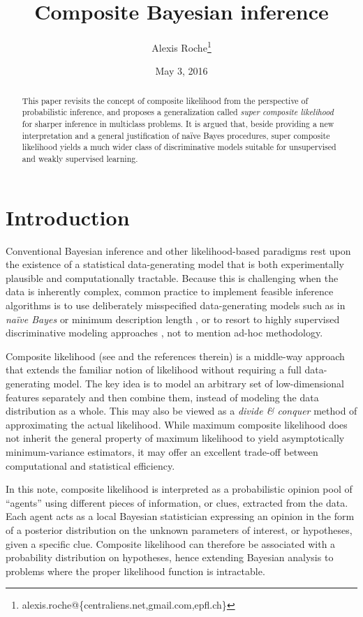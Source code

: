 \documentclass[english]{scrartcl}
\title{Composite Bayesian inference}
\date{May 3, 2016}
\author{Alexis Roche\thanks{alexis.roche@\{centraliens.net,gmail.com,epfl.ch\}}}
\begin{document}
\maketitle

\begin{abstract}
This paper revisits the concept of composite likelihood from the perspective of probabilistic inference, and proposes a generalization called {\em super composite likelihood} for sharper inference in multiclass problems. It is argued that, beside providing a new interpretation and a general justification of na\"ive Bayes procedures, super composite likelihood yields a much wider class of discriminative models suitable for unsupervised and weakly supervised learning.
\end{abstract}


\section{Introduction}
\label{sec:intro}

Conventional Bayesian inference and other likelihood-based paradigms rest upon the existence of a statistical data-generating model that is both experimentally plausible and computationally tractable. Because this is challenging when the data is inherently complex, common practice to implement feasible inference algorithms is to use deliberately misspecified data-generating models \cite{White-82,Walker-13} such as in {\em na\"ive Bayes} \cite{Ng-01} or minimum description length \cite{Grunwald-07}, or to resort to highly supervised discriminative modeling approaches \cite{Ng-01}, not to mention ad-hoc methodology.

Composite likelihood (see \cite{Varin-11} and the references therein) is a middle-way approach that extends the familiar notion of likelihood without requiring a full data-generating model. The key idea is to model an arbitrary set of low-dimensional features separately and then combine them, instead of modeling the data distribution as a whole. This may also be viewed as a {\em divide \& conquer} method of approximating the actual likelihood. While maximum composite likelihood does not inherit the general property of maximum likelihood to yield asymptotically minimum-variance estimators, it may offer an excellent trade-off between computational and statistical efficiency. 

In this note, composite likelihood is interpreted as a probabilistic opinion pool \cite{Genest-86,Garg-04} of ``agents'' using different pieces of information, or clues, extracted from the data. Each agent acts as a local Bayesian statistician expressing an opinion in the form of a posterior distribution on the unknown parameters of interest, or hypotheses, given a specific clue. Composite likelihood can therefore be associated with a probability distribution on hypotheses, hence extending Bayesian analysis to problems where the proper likelihood function is intractable.
\end{document}
